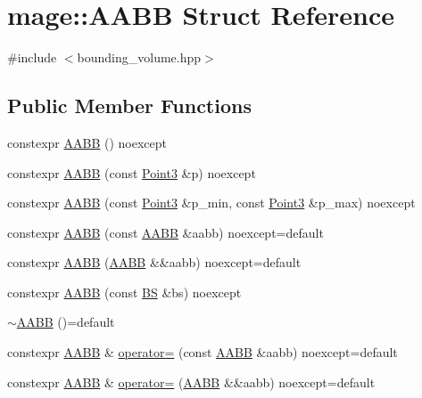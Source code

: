 \hypertarget{structmage_1_1_a_a_b_b}{}\section{mage\+:\+:A\+A\+BB Struct Reference}
\label{structmage_1_1_a_a_b_b}


{\ttfamily \#include $<$bounding\+\_\+volume.\+hpp$>$}

\subsection*{Public Member Functions}
\begin{DoxyCompactItemize}
\item 
constexpr \hyperlink{structmage_1_1_a_a_b_b_ac9b2292e07c85e8d4f3bd8fef7555175}{A\+A\+BB} () noexcept
\item 
constexpr \hyperlink{structmage_1_1_a_a_b_b_acbe5617aeeac1137081aeb5543ed6725}{A\+A\+BB} (const \hyperlink{structmage_1_1_point3}{Point3} \&p) noexcept
\item 
constexpr \hyperlink{structmage_1_1_a_a_b_b_a2ada8f2c36e24f6987087449d897e781}{A\+A\+BB} (const \hyperlink{structmage_1_1_point3}{Point3} \&p\+\_\+min, const \hyperlink{structmage_1_1_point3}{Point3} \&p\+\_\+max) noexcept
\item 
constexpr \hyperlink{structmage_1_1_a_a_b_b_a08a844f907789f856e1b554203c01ce3}{A\+A\+BB} (const \hyperlink{structmage_1_1_a_a_b_b}{A\+A\+BB} \&aabb) noexcept=default
\item 
constexpr \hyperlink{structmage_1_1_a_a_b_b_a249bec332ca4872a236637d7ef0dcb83}{A\+A\+BB} (\hyperlink{structmage_1_1_a_a_b_b}{A\+A\+BB} \&\&aabb) noexcept=default
\item 
constexpr \hyperlink{structmage_1_1_a_a_b_b_a354d4bfbc674c807f2ba6ed86665f75d}{A\+A\+BB} (const \hyperlink{structmage_1_1_b_s}{BS} \&bs) noexcept
\item 
\hyperlink{structmage_1_1_a_a_b_b_a0fa31372f7488cb30b886c77bd676f17}{$\sim$\+A\+A\+BB} ()=default
\item 
constexpr \hyperlink{structmage_1_1_a_a_b_b}{A\+A\+BB} \& \hyperlink{structmage_1_1_a_a_b_b_a25146a7fe2cc32b9cfab0e4556d76cc9}{operator=} (const \hyperlink{structmage_1_1_a_a_b_b}{A\+A\+BB} \&aabb) noexcept=default
\item 
constexpr \hyperlink{structmage_1_1_a_a_b_b}{A\+A\+BB} \& \hyperlink{structmage_1_1_a_a_b_b_ad3922871f317937fb328cf0fdfe8b644}{operator=} (\hyperlink{structmage_1_1_a_a_b_b}{A\+A\+BB} \&\&aabb) noexcept=default

\end{DoxyCompactItemize}
